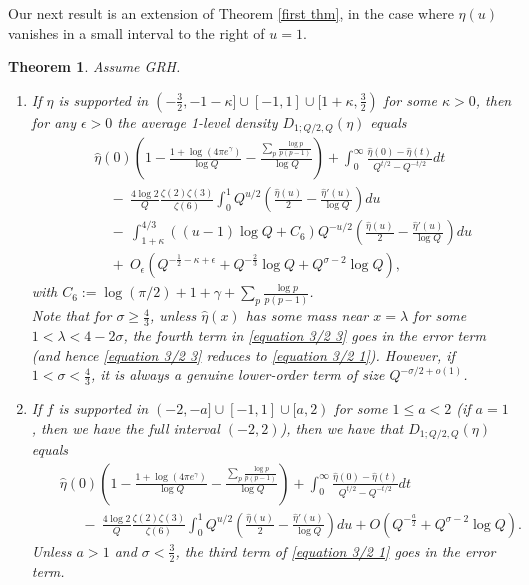 \documentclass[12pt,reqno]{amsart}
\numberwithin{equation}{section}
\theoremstyle{plain}
\newtheorem{theorem}[thm]{Theorem}
\begin{document}
Our next result is an extension of Theorem \ref{first thm}, in the case where $\hat{\eta}(u)$ vanishes in a small interval to the right of $u=1$.
\begin{theorem}\label{thm 3/2} Assume GRH.

\begin{enumerate}

\item If $\hat{\eta}$ is supported in $(-\frac 32, -1-\kappa] \cup [-1,1] \cup [1+\kappa, \frac 32)$ for some $\kappa>0$, then for any $\epsilon >0$ the average 1-level density $D_{1;Q/2,Q}(\eta)$ equals
\begin{eqnarray}\label{equation 3/2 3}
& & \hat{\eta}(0) \left( 1-\frac{1+\log(4\pi e^{\gamma})}{\log Q} -\frac{\sum_p \frac{\log p}{p(p-1)}}{\log Q}\right)+\int_0^{\infty}\frac{{\widehat{\eta}}(0)-{\widehat{\eta}}(t)}{Q^{t/2}-Q^{-t/2}} dt
    \nonumber\\
& & \ \ \ \ \ - \ \frac{4\log 2}Q \frac{\zeta(2)\zeta(3)}{\zeta(6)} \int_0^{1} Q^{u/2}\left(\frac {\hat{\eta}(u)}2 -\frac {\hat{\eta}'(u)}{\log Q}\right) du
\nonumber\\
& & \ \ \ \ \  - \ \int_{1+\kappa}^{4/3}(  (u-1)\log Q+C_6  ) Q^{-u/2} \left(\frac {\hat{\eta}(u)}2 -\frac {\hat{\eta}'(u)}{\log Q}\right) du \nonumber \\
& & \ \ \ \ \ + \ O_{\epsilon}(Q^{-\frac 12-\kappa+\epsilon}+Q^{-\frac 23}\log Q+Q^{\sigma-2}\log Q),
\end{eqnarray}
with $C_6:= \log (\pi/2) +1+ \gamma + \sum_p \frac{\log p}{p(p-1)}$.\\
Note that for $\sigma \geq \frac 43$, unless $\hat{\eta}(x)$ has some mass near $x=\lambda$ for some $1<\lambda<4-2\sigma$, the fourth term in \eqref{equation 3/2 3} goes in the error term (and hence \eqref{equation 3/2 3} reduces to \eqref{equation 3/2 1}). However, if $1<\sigma<\frac 43$, it is always a genuine lower-order term of size $Q^{-\sigma/2+o(1)}$.

\item If $f$ is supported in $(-2,-a] \cup [-1,1] \cup [a,2)$ for some $1\leq a<2$ (if $a=1$, then we have the full interval $(-2,2)$), then we have that $D_{1;Q/2,Q}(\eta)$ equals
\begin{eqnarray}
& & \hat{\eta}(0) \left( 1-\frac{1+\log(4\pi e^{\gamma})}{\log Q} -\frac{\sum_p \frac{\log p}{p(p-1)}}{\log Q}\right)+\int_0^{\infty}\frac{{\widehat{\eta}}(0)-{\widehat{\eta}}(t)}{Q^{t/2}-Q^{-t/2}} dt
    \nonumber\\ & & \ \ \ \ \ \ \ - \  \frac{4\log 2}Q \frac{\zeta(2)\zeta(3)}{\zeta(6)} \int_0^{1} Q^{u/2}\left(\frac {{\widehat{\eta}}(u)}2 -\frac {{\widehat{\eta}}'(u)}{\log Q}\right) du
+ O(Q^{-\frac a2}+Q^{\sigma-2}\log Q).
\label{equation 3/2 1}
\end{eqnarray}
Unless $a>1$ and $\sigma<\frac 32$, the third term of \eqref{equation 3/2 1} goes in the error term.\\

\end{enumerate}

\end{theorem}
\end{document}
